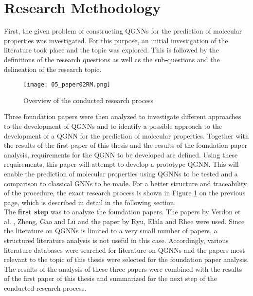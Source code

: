 \section{Research Methodology}

First, the given problem of constructing QGNNs for the prediction of molecular properties was investigated. For this purpose, an initial investigation of the literature took place and the topic was explored. This is followed by the definitions of the research questions as well as the sub-questions and the delineation of the research topic. \\

\begin{figure}[h!]
    \centering
    \texttt{[image: 05\_paper02RM.png]}
    \caption[Overview of the conducted research process]{\label{img:paper02rm}{Overview of the conducted research process}}
    \end{figure} 

Three foundation papers were then analyzed to investigate different approaches to the development of QGNNs and to identify a possible approach to the development of a QGNN for the prediction of molecular properties. Together with the results of the first paper of this thesis and the results of the foundation paper analysis, requirements for the QGNN to be developed are defined. Using these requirements, this paper will attempt to develop a prototype QGNN. This will enable the prediction of molecular properties using QGNNs to be tested and a comparison to classical GNNs to be made.  For a better structure and traceability of the procedure, the exact research process is shown in Figure \ref{img:paper02rm} on the previous page, which is described in detail in the following section. \\

The \textbf{first step} was to analyze the foundation papers. The papers by Verdon et al. \cite{verdon_quantum_2019}, Zheng, Gao and Lü \cite{zheng2021quantum} and the paper by Ryu, Elala and Rhee \cite{ryu2023quantum} were used. Since the literature on QGNNs is limited to a very small number of papers, a structured literature analysis is not useful in this case. Accordingly, various literature databases were searched for literature on QGNNs and the papers most relevant to the topic of this thesis were selected for the foundation paper analysis. The results of the analysis of these three papers were combined with the results of the first paper of this thesis and summarized for the next step of the conducted research process. \\

